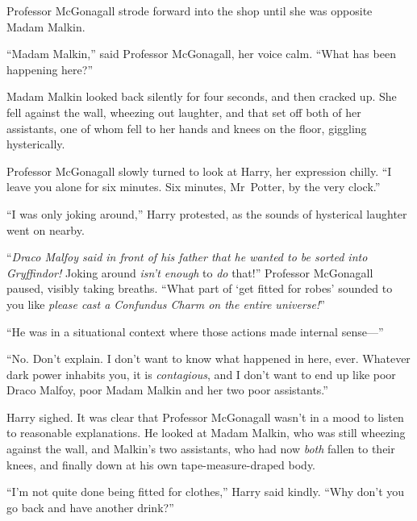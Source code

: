 Professor McGonagall strode forward into the shop until she was opposite Madam Malkin.

“Madam Malkin,” said Professor McGonagall, her voice calm.
“What has been happening here?”

Madam Malkin looked back silently for four seconds, and then cracked up. She fell against the wall, wheezing out laughter, and that set off both of her assistants, one of whom fell to her hands and knees on the floor, giggling hysterically.

Professor McGonagall slowly turned to look at Harry, her expression chilly.
“I leave you alone for six minutes. Six minutes, Mr~Potter, by the very clock.”

“I was only joking around,” Harry protested, as the sounds of hysterical laughter went on nearby.

“\emph{Draco Malfoy said in front of his father that he wanted to be sorted into Gryffindor!} Joking around \emph{isn’t enough} to \emph{do} that!” Professor McGonagall paused, visibly taking breaths.
“What part of ‘get fitted for robes’ sounded to you like \emph{please cast a Confundus Charm on the entire universe!}”

“He was in a situational context where those actions made internal sense—”

“No. Don’t explain. I don’t want to know what happened in here, ever. Whatever dark power inhabits you, it is \emph{contagious}, and I don’t want to end up like poor Draco Malfoy, poor Madam Malkin and her two poor assistants.”

Harry sighed. It was clear that Professor McGonagall wasn’t in a mood to listen to reasonable explanations. He looked at Madam Malkin, who was still wheezing against the wall, and Malkin’s two assistants, who had now \emph{both} fallen to their knees, and finally down at his own tape-measure-draped body.

“I’m not quite done being fitted for clothes,” Harry said kindly.
“Why don’t you go back and have another drink?”

